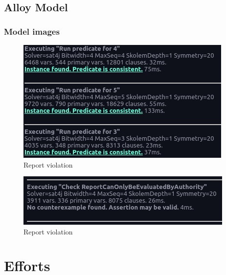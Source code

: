 \documentclass{article}
\begin{document}
\subsection{Alloy Model}


\subsubsection{Model images}
\begin{figure}[H]
    \centering
    \includegraphics[scale=0.5]{img/alloy/predicates.png}
    \caption{Report violation}
\end{figure}

\begin{figure}[H]
    \centering
    \includegraphics[scale=0.5]{img/alloy/checks.png}
    \caption{Report violation}
\end{figure}

\section{Efforts}
\end{document}
